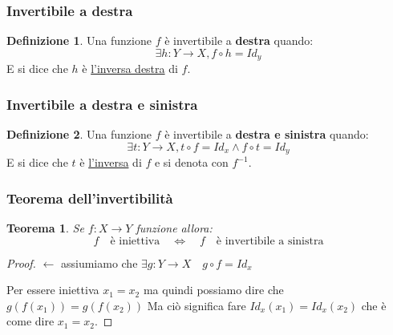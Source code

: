 \documentclass{article}
\newtheorem{theorem}{Teorema}[section]
\theoremstyle{definition}
\newtheorem{definition}{Definizione}[section]
\begin{document}
\subsubsection{Invertibile a destra}\label{sec:invertibile_a_destra}
\begin{definition}     
        Una funzione $ f $ è invertibile a \textbf{destra} quando:
        \begin{equation*}
                \exists h : Y \to X, f \circ h = Id_y 
        \end{equation*}
        E si dice che $ h $ è \underline{l'inversa destra} di $ f $.           
\end{definition}



\subsubsection{Invertibile a destra e sinistra}\label{sec:invertibile_a_destra_e_sinistra}
\begin{definition}     
        Una funzione $ f $ è invertibile a \textbf{destra e sinistra} quando:
        \begin{equation*}
                \exists t : Y \to X, t \circ f = Id_x \wedge f \circ t = Id_y 
        \end{equation*}
        E si dice che $ t  $ è \underline{l'inversa} di $ f $ e si denota con $ f^{-1} $.           
\end{definition}



\subsubsection{Teorema dell'invertibilità}
\begin{theorem}
       Se $ f: X \to Y $ funzione allora:
       \begin{equation*}
               f \quad \mbox{è iniettiva} \quad \Leftrightarrow \quad f \quad \mbox{è invertibile a sinistra}
       \end{equation*}
\end{theorem}

\begin{tcolorbox}
\begin{proof}
        $ \leftarrow $ assiumiamo che $ \exists g : Y \to X \quad g \circ f = Id_x  $ \par
        Per essere iniettiva $ x_1 = x_2$ ma quindi possiamo dire che $ g(f(x_1)) = g(f(x_2)) $ \newline
        Ma ciò significa fare $ Id_x(x_1) = Id_x(x_2) $ che è come dire $ x_1 = x_2 $.  
\end{proof}
\end{tcolorbox}
\end{document}
